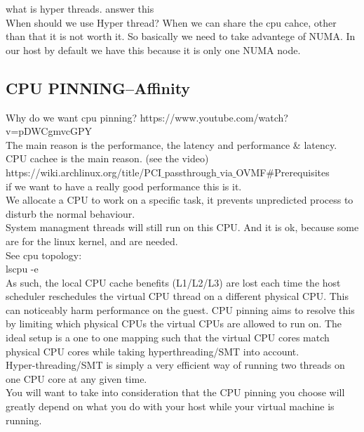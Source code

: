 \documentclass[11pt, a4paper, oneside]{article}
\theoremstyle{definition}
\begin{document}
what is hyper threads. answer this\\
When should we use Hyper thread? When we can share the cpu cahce, other than that it is not worth it. So basically we need to take advantege of NUMA. In our host by default we have this because it is only one NUMA node.\\

\subsection{CPU PINNING--Affinity}
Why do we want cpu pinning? https://www.youtube.com/watch?v=pDWCgmvcGPY\\
The main reason is the performance, the latency and performance \& latency.\\
CPU cachee is the main reason. (see the video)\\


https://wiki.archlinux.org/title/PCI$\_$passthrough$\_$via$\_$OVMF$\#$Prerequisites\\

if we want to have a really good performance this is it.\\
We allocate a CPU to work on a specific task, it prevents unpredicted process to disturb the normal behaviour.\\
System managment threads will still run on this CPU. And it is ok, because some are for the linux kernel, and are needed.\\

See cpu topology:\\
lscpu -e\\

As such, the local CPU cache benefits (L1/L2/L3) are lost each time the host scheduler reschedules the virtual CPU thread on a different physical CPU. This can noticeably harm performance on the guest. CPU pinning aims to resolve this by limiting which physical CPUs the virtual CPUs are allowed to run on. The ideal setup is a one to one mapping such that the virtual CPU cores match physical CPU cores while taking hyperthreading/SMT into account. \\

Hyper-threading/SMT is simply a very efficient way of running two threads on one CPU core at any given time.\\
You will want to take into consideration that the CPU pinning you choose will greatly depend on what you do with your host while your virtual machine is running. \\
\end{document}
